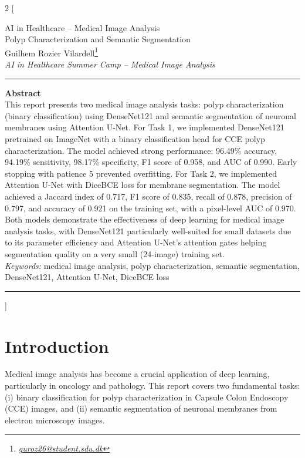 ﻿\documentclass[a4paper,10pt]{article}
\begin{document}
\begin{multicols*}{2}
[
\begin{center}
\vspace*{0mm}
{\large
AI in Healthcare – Medical Image Analysis \\
\vspace{3mm}
Polyp Characterization and Semantic Segmentation
}\\
\vspace{8mm}
Guilhem Rozier Vilardell\footnote{\textit{\href{mailto:guroz26@student.sdu.dk}{guroz26@student.sdu.dk}}}
\\
\vspace{3mm}
\footnotesize{
\textit{AI in Healthcare Summer Camp – Medical Image Analysis}
}\\
\vspace{9mm}
\end{center}
\rule{\linewidth}{0.4pt}
\onehalfspacing
\textbf{Abstract}\\
This report presents two medical image analysis tasks: polyp characterization (binary classification) using DenseNet121 and semantic segmentation of neuronal membranes using Attention U-Net. For Task 1, we implemented DenseNet121 pretrained on ImageNet with a binary classification head for CCE polyp characterization. The model achieved strong performance: 96.49\% accuracy, 94.19\% sensitivity, 98.17\% specificity, F1 score of 0.958, and AUC of 0.990. Early stopping with patience 5 prevented overfitting. For Task 2, we implemented Attention U-Net with DiceBCE loss for membrane segmentation. The model achieved a Jaccard index of 0.717, F1 score of 0.835, recall of 0.878, precision of 0.797, and accuracy of 0.921 on the training set, with a pixel-level AUC of 0.970. Both models demonstrate the effectiveness of deep learning for medical image analysis tasks, with DenseNet121 particularly well-suited for small datasets due to its parameter efficiency and Attention U-Net's attention gates helping segmentation quality on a very small (24-image) training set.\\
\noindent\textit{Keywords:} medical image analysis, polyp characterization, semantic segmentation, DenseNet121, Attention U-Net, DiceBCE loss\\
\rule{\linewidth}{0.4pt}
]
\singlespacing

\tableofcontents

\setlength{\parskip}{1pt}
\columnbreak

\section{Introduction}
Medical image analysis has become a crucial application of deep learning, particularly in oncology and pathology. This report covers two fundamental tasks: (i) binary classification for polyp characterization in Capsule Colon Endoscopy (CCE) images, and (ii) semantic segmentation of neuronal membranes from electron microscopy images.


\end{multicols*}
\end{document}
